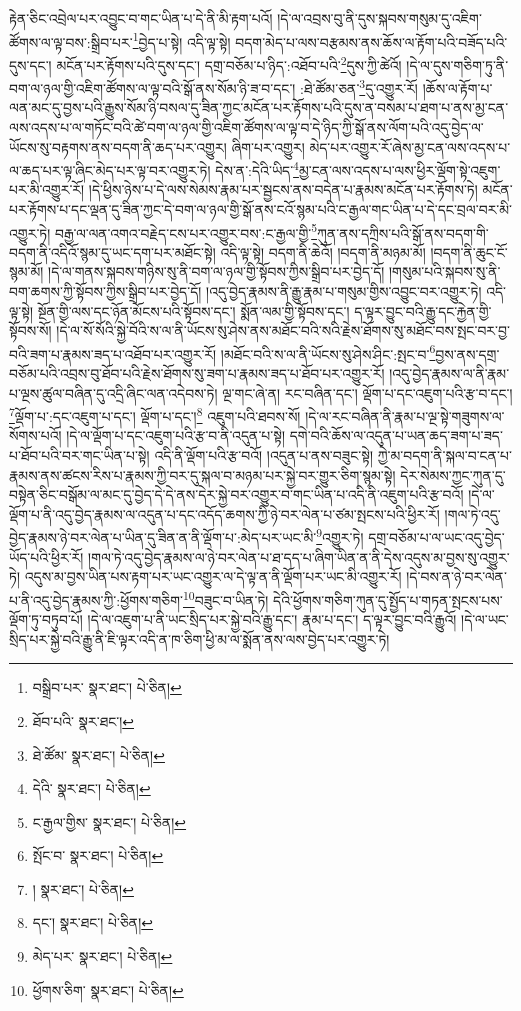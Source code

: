 རྟེན་ཅིང་འབྲེལ་པར་འབྱུང་བ་གང་ཡིན་པ་དེ་ནི་མི་རྟག་པའོ། །དེ་ལ་འབྲས་བུ་ནི་དུས་སྐབས་གསུམ་དུ་འཇིག་ཚོགས་ལ་ལྟ་བས་:སྒྲིབ་པར་\footnote{བསྒྲིབ་པར་  སྣར་ཐང་།  པེ་ཅིན། }བྱེད་པ་སྟེ། འདི་ལྟ་སྟེ། བདག་མེད་པ་ལས་བརྩམས་ནས་ཆོས་ལ་རྟོག་པའི་བཟོད་པའི་དུས་དང་། མངོན་པར་རྟོགས་པའི་དུས་དང་། དགྲ་བཅོམ་པ་ཉིད་:འཐོབ་པའི་\footnote{ཐོབ་པའི་  སྣར་ཐང་། }དུས་ཀྱི་ཚེའོ། །དེ་ལ་དུས་གཅིག་ཏུ་ནི་བག་ལ་ཉལ་གྱི་འཇིག་ཚོགས་ལ་ལྟ་བའི་སྒོ་ནས་སོམ་ཉི་ཟ་བ་དང་། :ཐེ་ཚོམ་ཅན་\footnote{ཐེ་ཚོམ་  སྣར་ཐང་།  པེ་ཅིན། }དུ་འགྱུར་རོ། །ཆོས་ལ་རྟོག་པ་ལན་མང་དུ་བྱས་པའི་རྒྱུས་སོམ་ཉི་བསལ་དུ་ཟིན་ཀྱང་མངོན་པར་རྟོགས་པའི་དུས་ན་བསམ་པ་ཐག་པ་ནས་མྱ་ངན་ལས་འདས་པ་ལ་གཏོང་བའི་ཚེ་བག་ལ་ཉལ་གྱི་འཇིག་ཚོགས་ལ་ལྟ་བ་དེ་ཉིད་ཀྱི་སྒོ་ནས་ལོག་པའི་འདུ་བྱེད་ལ་ཡོངས་སུ་བརྟགས་ནས་བདག་ནི་ཆད་པར་འགྱུར། ཞིག་པར་འགྱུར། མེད་པར་འགྱུར་རོ་ཞེས་མྱ་ངན་ལས་འདས་པ་ལ་ཆད་པར་ལྟ་ཞིང་མེད་པར་ལྟ་བར་འགྱུར་ཏེ། དེས་ན་:དེའི་ཡིད་\footnote{དེའི་  སྣར་ཐང་།  པེ་ཅིན། }མྱ་ངན་ལས་འདས་པ་ལས་ཕྱིར་ལྡོག་སྟེ་འཇུག་པར་མི་འགྱུར་རོ། །དེ་ཕྱིས་ཉེས་པ་དེ་ལས་སེམས་རྣམ་པར་སྦྱངས་ནས་བདེན་པ་རྣམས་མངོན་པར་རྟོགས་ཏེ། མངོན་པར་རྟོགས་པ་དང་ལྡན་དུ་ཟིན་ཀྱང་དེ་བག་ལ་ཉལ་གྱི་སྒོ་ནས་ངའོ་སྙམ་པའི་ང་རྒྱལ་གང་ཡིན་པ་དེ་དང་བྲལ་བར་མི་འགྱུར་ཏེ། བརྒྱ་ལ་ལན་འགའ་བརྗེད་ངས་པར་འགྱུར་བས་:ང་རྒྱལ་གྱི་\footnote{ང་རྒྱལ་གྱིས་  སྣར་ཐང་།  པེ་ཅིན། }ཀུན་ནས་དཀྲིས་པའི་སྒོ་ནས་བདག་གི་བདག་ནི་འདིའོ་སྙམ་དུ་ཡང་དག་པར་མཐོང་སྟེ། འདི་ལྟ་སྟེ། བདག་ནི་ཆེའོ། །བདག་ནི་མཉམ་མོ། །བདག་ནི་ཆུང་ངོ་སྙམ་མོ། །དེ་ལ་གནས་སྐབས་གཉིས་སུ་ནི་བག་ལ་ཉལ་གྱི་སྟོབས་ཀྱིས་སྒྲིབ་པར་བྱེད་དོ། །གསུམ་པའི་སྐབས་སུ་ནི་བག་ཆགས་ཀྱི་སྟོབས་ཀྱིས་སྒྲིབ་པར་བྱེད་དོ། །འདུ་བྱེད་རྣམས་ནི་རྒྱུ་རྣམ་པ་གསུམ་གྱིས་འབྱུང་བར་འགྱུར་ཏེ། འདི་ལྟ་སྟེ། སྔོན་གྱི་ལས་དང་ཉོན་མོངས་པའི་སྟོབས་དང་། སྨོན་ལམ་གྱི་སྟོབས་དང་། ད་ལྟར་བྱུང་བའི་རྒྱུ་དང་རྐྱེན་གྱི་སྟོབས་སོ། །དེ་ལ་སོ་སོའི་སྐྱེ་བོའི་ས་ལ་ནི་ཡོངས་སུ་ཤེས་ནས་མཐོང་བའི་སའི་རྗེས་ཐོགས་སུ་མཐོང་བས་སྤང་བར་བྱ་བའི་ཟག་པ་རྣམས་ཟད་པ་འཐོབ་པར་འགྱུར་རོ། །མཐོང་བའི་ས་ལ་ནི་ཡོངས་སུ་ཤེས་ཤིང་:སྤང་བ་\footnote{སྤོང་བ་  སྣར་ཐང་།  པེ་ཅིན། }བྱས་ནས་དགྲ་བཅོམ་པའི་འབྲས་བུ་ཐོབ་པའི་རྗེས་ཐོགས་སུ་ཟག་པ་རྣམས་ཟད་པ་ཐོབ་པར་འགྱུར་རོ། །འདུ་བྱེད་རྣམས་ལ་ནི་རྣམ་པ་ལྔས་ཚུལ་བཞིན་དུ་འདྲི་ཞིང་ལན་འདེབས་ཏེ། ལྔ་གང་ཞེ་ན། རང་བཞིན་དང་། ལྡོག་པ་དང་འཇུག་པའི་རྩ་བ་དང་། \footnote{།    སྣར་ཐང་།  པེ་ཅིན། }ལྡོག་པ་:དང་འཇུག་པ་དང་། ལྡོག་པ་དང་།\footnote{དང་།  སྣར་ཐང་།  པེ་ཅིན། } འཇུག་པའི་ཐབས་སོ། །དེ་ལ་རང་བཞིན་ནི་རྣམ་པ་ལྔ་སྟེ་གཟུགས་ལ་སོགས་པའོ། །དེ་ལ་ལྡོག་པ་དང་འཇུག་པའི་རྩ་བ་ནི་འདུན་པ་སྟེ། དགེ་བའི་ཆོས་ལ་འདུན་པ་ཡན་ཆད་ཟག་པ་ཟད་པ་ཐོབ་པའི་བར་གང་ཡིན་པ་སྟེ། འདི་ནི་ལྡོག་པའི་རྩ་བའོ། །འདུན་པ་ནས་བཟུང་སྟེ། ཀྱེ་མ་བདག་ནི་སྐལ་བ་ངན་པ་རྣམས་ནས་ཚངས་རིས་པ་རྣམས་ཀྱི་བར་དུ་སྐལ་བ་མཉམ་པར་སྐྱེ་བར་གྱུར་ཅིག་སྙམ་སྟེ། དེར་སེམས་ཀྱང་ཀུན་དུ་བསྟེན་ཅིང་བསྒོམ་ལ་མང་དུ་བྱེད་དེ་དེ་ནས་དེར་སྐྱེ་བར་འགྱུར་བ་གང་ཡིན་པ་འདི་ནི་འཇུག་པའི་རྩ་བའོ། །དེ་ལ་ལྡོག་པ་ནི་འདུ་བྱེད་རྣམས་ལ་འདུན་པ་དང་འདོད་ཆགས་ཀྱི་ཉེ་བར་ལེན་པ་ཙམ་སྤངས་པའི་ཕྱིར་རོ། །གལ་ཏེ་འདུ་བྱེད་རྣམས་ཉེ་བར་ལེན་པ་ཡིན་དུ་ཟིན་ན་ནི་ལྡོག་པ་:མེད་པར་ཡང་མི་\footnote{མེད་པར་  སྣར་ཐང་།  པེ་ཅིན། }འགྱུར་ཏེ། དགྲ་བཅོམ་པ་ལ་ཡང་འདུ་བྱེད་ཡོད་པའི་ཕྱིར་རོ། །གལ་ཏེ་འདུ་བྱེད་རྣམས་ལ་ཉེ་བར་ལེན་པ་ཐ་དད་པ་ཞིག་ཡིན་ན་ནི་དེས་འདུས་མ་བྱས་སུ་འགྱུར་ཏེ། འདུས་མ་བྱས་ཡིན་པས་རྟག་པར་ཡང་འགྱུར་ལ་དེ་ལྟ་ན་ནི་ལྡོག་པར་ཡང་མི་འགྱུར་རོ། །དེ་བས་ན་ཉེ་བར་ལེན་པ་ནི་འདུ་བྱེད་རྣམས་ཀྱི་:ཕྱོགས་གཅིག་\footnote{ཕྱོགས་ཅིག་  སྣར་ཐང་།  པེ་ཅིན། }བཟུང་བ་ཡིན་ཏེ། དེའི་ཕྱོགས་གཅིག་ཀུན་དུ་སྤྱོད་པ་གཏན་སྤངས་པས་ལྡོག་ཏུ་བཏུབ་པོ། །དེ་ལ་འཇུག་པ་ནི་ཡང་སྲིད་པར་སྐྱེ་བའི་རྒྱུ་དང་། རྣམ་པ་དང་། ད་ལྟར་བྱུང་བའི་རྒྱུའོ། །དེ་ལ་ཡང་སྲིད་པར་སྐྱེ་བའི་རྒྱུ་ནི་ཇི་ལྟར་འདི་ན་ཁ་ཅིག་ཕྱི་མ་ལ་སྨོན་ནས་ལས་བྱེད་པར་འགྱུར་ཏེ། 